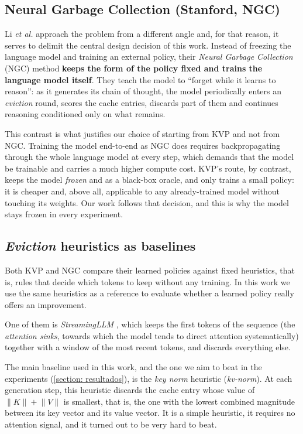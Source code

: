\subsection{Neural Garbage Collection (Stanford, NGC)} \label{subsec: ngc}

Li \textit{et al.} \cite{li2026ngc} approach the problem from a different angle and, for that reason, it serves to delimit the central design decision of this work. Instead of freezing the language model and training an external policy, their \emph{Neural Garbage Collection} (NGC) method \textbf{keeps the form of the policy fixed and trains the language model itself}. They teach the model to ``forget while it learns to reason'': as it generates its chain of thought, the model periodically enters an \textit{eviction} round, scores the cache entries, discards part of them and continues reasoning conditioned only on what remains.

This contrast is what justifies our choice of starting from KVP and not from NGC. Training the model end-to-end as NGC does requires backpropagating through the whole language model at every step, which demands that the model be trainable and carries a much higher compute cost. KVP's route, by contrast, keeps the model \emph{frozen} and as a black-box oracle, and only trains a small policy: it is cheaper and, above all, applicable to any already-trained model without touching its weights. Our work follows that decision, and this is why the model stays frozen in every experiment.


\subsection{\textit{Eviction} heuristics as baselines} \label{subsec: heuristicas}

Both KVP and NGC compare their learned policies against fixed heuristics, that is, rules that decide which tokens to keep without any training. In this work we use the same heuristics as a reference to evaluate whether a learned policy really offers an improvement.

One of them is \emph{StreamingLLM} \cite{xiao2024streamingllm}, which keeps the first tokens of the sequence (the \textit{attention sinks}, towards which the model tends to direct attention systematically) together with a window of the most recent tokens, and discards everything else.

The main baseline used in this work, and the one we aim to beat in the experiments (\cref{section: resultados}), is the \emph{key norm} heuristic (\textit{kv-norm}). At each generation step, this heuristic discards the cache entry whose value of $\lVert K\rVert + \lVert V\rVert$ is smallest, that is, the one with the lowest combined magnitude between its key vector and its value vector. It is a simple heuristic, it requires no attention signal, and it turned out to be very hard to beat.

